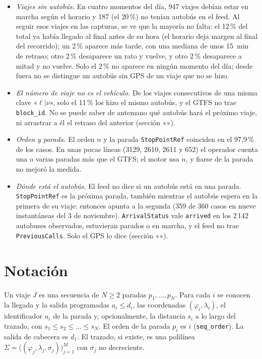 \begin{itemize}
  \item \emph{Viajes sin autobús.} En cuatro momentos del día, 947 viajes debían estar en marcha según el horario y
        187 (el 20\,\%) no tenían autobús en el feed. Al seguir esos viajes en las capturas, se ve que la mayoría no falta: el
        12\,\% del total ya había llegado al final antes de su hora (el horario deja margen al final del recorrido);
        un 2\,\% aparece más tarde, con una mediana de unos 15~min de retraso; otro 2\,\% desaparece un rato y vuelve, y otro
        2\,\% desaparece a mitad y no vuelve. Solo el 2\,\% no aparece en ningún momento del día; desde fuera no se distingue
        un autobús sin GPS de un viaje que no se hizo.
  \item \emph{El número de viaje no es el vehículo.} De los viajes consecutivos de una misma clave «$\ell|\nu$», solo
        el 11\,\% los hizo el mismo autobús, y el GTFS no trae \texttt{block\_id}. No se puede saber de antemano qué
        autobús hará el próximo viaje, ni arrastrar a él el retraso del anterior (sección «»).
  \item \emph{Orden y parada.} El orden $n$ y la parada \texttt{StopPointRef} coinciden en el 97,9\,\% de los
        casos. En unas pocas líneas (3129, 2610, 2611 y 652) el operador cuenta una o varias paradas más que el GTFS;
        el motor usa $n$, y fiarse de la parada no mejoró la medida.
  \item \emph{Dónde está el autobús.} El feed no dice si un autobús está en una parada. \texttt{StopPointRef} es
        la próxima parada, también mientras el autobús espera en la primera de su viaje: entonces apunta a la segunda
        (359 de 360 casos en nueve instantáneas del 3 de noviembre). \texttt{ArrivalStatus} vale \texttt{arrived} en los 2\,142 autobuses
        observados, estuvieran parados o en marcha, y el feed no trae \texttt{PreviousCalls}. Solo el GPS lo dice (sección
        «»).
\end{itemize}

\section{Notación}
\label{sec:notacion}

\begin{definicion}[Viaje]
Un viaje $J$ es una secuencia de $N\ge2$ paradas $p_1,\dots,p_N$. Para cada $i$ se conocen la llegada y la salida
programadas $a_i\le d_i$, las coordenadas $(\varphi_i,\lambda_i)$, el identificador $u_i$ de la parada y,
opcionalmente, la distancia $s_i$ a lo largo del trazado, con $s_1\le s_2\le\dots\le s_N$. El orden de la parada
$p_i$ es $i$ (\texttt{seq\_order}). La salida de cabecera es $d_1$. El trazado, si existe, es una polilínea
$\Sigma=\big((\varphi_j,\lambda_j,\sigma_j)\big)_{j=1}^{M}$ con $\sigma_j$ no decreciente.
\end{definicion}

